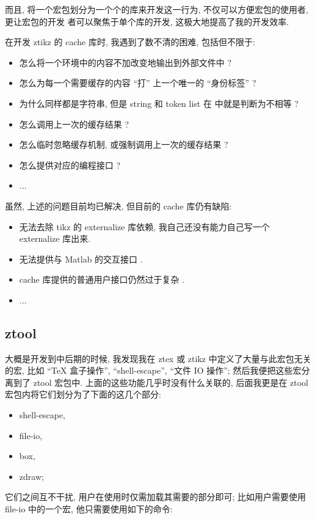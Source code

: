 \documentclass[
  hyper, lang=cn,
  mathSpec={envStyle=leftbar},
]{../../zlatex/code/ztex}
\let\cmd\ztexverb
\newcommand{\pkg}[1]{\textsf{#1}}
\newcommand{\cls}[1]{\textsf{#1}}
\begin{document}
而且, 将一个宏包划分为一个个的库来开发这一行为, 不仅可以方便宏包的使用者, 更让宏包的开发
者可以聚焦于单个库的开发, 这极大地提高了我的开发效率.

在开发 \pkg{ztikz} 的 \pkg{cache} 库时, 我遇到了数不清的困难, 包括但不限于:
\begin{itemize}
  \item 怎么将一个环境中的内容不加改变地输出到外部文件中 ?
  \item 怎么为每一个需要缓存的内容 ``打'' 上一个唯一的 ``身份标签'' ?
  \item 为什么同样都是字符串, 但是 string 和 token list 在 \cmd{\tl_if_eq:nn} 中就是判断为不相等 ?
  \item 怎么调用上一次的缓存结果 ?
  \item 怎么临时忽略缓存机制, 或强制调用上一次的缓存结果 ?
  \item 怎么提供对应的编程接口 ?
  \item ...
\end{itemize}

\noindent 虽然, 上述的问题目前均已解决, 但目前的 \pkg{cache} 库仍有缺陷:
\begin{itemize}
  \item 无法去除 \pkg{tikz} 的 \pkg{externalize} 库依赖, 我自己还没有能力自己写一个 \pkg{externalize} 库出来.
  \item 无法提供与 Matlab 的交互接口 .
  \item \pkg{cache} 库提供的普通用户接口仍然过于复杂 .
  \item ...
\end{itemize}


\subsection{ztool}
大概是开发到中后期的时候, 我发现我在 \cls{ztex} 或 \pkg{ztikz} 中定义了大量与此宏包无关的宏, 
比如 ``\TeX{} 盒子操作'', ``shell-escape'', ``文件 IO 操作''; 然后我便把这些宏分离到了 \pkg{ztool} 
宏包中. 上面的这些功能几乎时没有什么关联的, 后面我更是在 \pkg{ztool} 宏包内将它们划分为了下面的这几个部分:
\begin{itemize}
  \item shell-escape,
  \item file-io,
  \item box,
  \item zdraw;
\end{itemize}

它们之间互不干扰, 用户在使用时仅需加载其需要的部分即可; 比如用户需要使用 \pkg{file-io} 中的一个宏,
他只需要使用如下的命令:
\begin{texhigh}[]
\end{texhigh}
\end{document}
